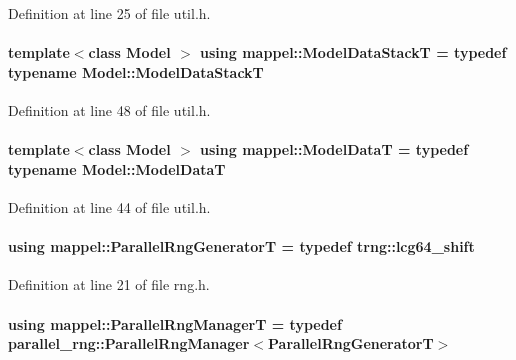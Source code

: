 Definition at line 25 of file util.\+h.

\paragraph[{\texorpdfstring{Model\+Data\+StackT}{ModelDataStackT}}]{\setlength{\rightskip}{0pt plus 5cm}template$<$class Model $>$ using {\bf mappel\+::\+Model\+Data\+StackT} = typedef typename Model\+::\+Model\+Data\+StackT}\hypertarget{namespacemappel_aaeb6665bc57476dd93c2df6ad8bc4768}{}\label{namespacemappel_aaeb6665bc57476dd93c2df6ad8bc4768}


Definition at line 48 of file util.\+h.

\paragraph[{\texorpdfstring{Model\+DataT}{ModelDataT}}]{\setlength{\rightskip}{0pt plus 5cm}template$<$class Model $>$ using {\bf mappel\+::\+Model\+DataT} = typedef typename Model\+::\+Model\+DataT}\hypertarget{namespacemappel_a97f050df953605381ae9c901c3b125f1}{}\label{namespacemappel_a97f050df953605381ae9c901c3b125f1}


Definition at line 44 of file util.\+h.

\paragraph[{\texorpdfstring{Parallel\+Rng\+GeneratorT}{ParallelRngGeneratorT}}]{\setlength{\rightskip}{0pt plus 5cm}using {\bf mappel\+::\+Parallel\+Rng\+GeneratorT} = typedef trng\+::lcg64\+\_\+shift}\hypertarget{namespacemappel_ad1e99b214465229065d30f881a89d1cc}{}\label{namespacemappel_ad1e99b214465229065d30f881a89d1cc}


Definition at line 21 of file rng.\+h.

\paragraph[{\texorpdfstring{Parallel\+Rng\+ManagerT}{ParallelRngManagerT}}]{\setlength{\rightskip}{0pt plus 5cm}using {\bf mappel\+::\+Parallel\+Rng\+ManagerT} = typedef parallel\+\_\+rng\+::\+Parallel\+Rng\+Manager$<${\bf Parallel\+Rng\+GeneratorT}$>$}\hypertarget{namespacemappel_acf276a4212f07b1ed4cb2ddce379ba1d}{}\label{namespacemappel_acf276a4212f07b1ed4cb2ddce379ba1d}


